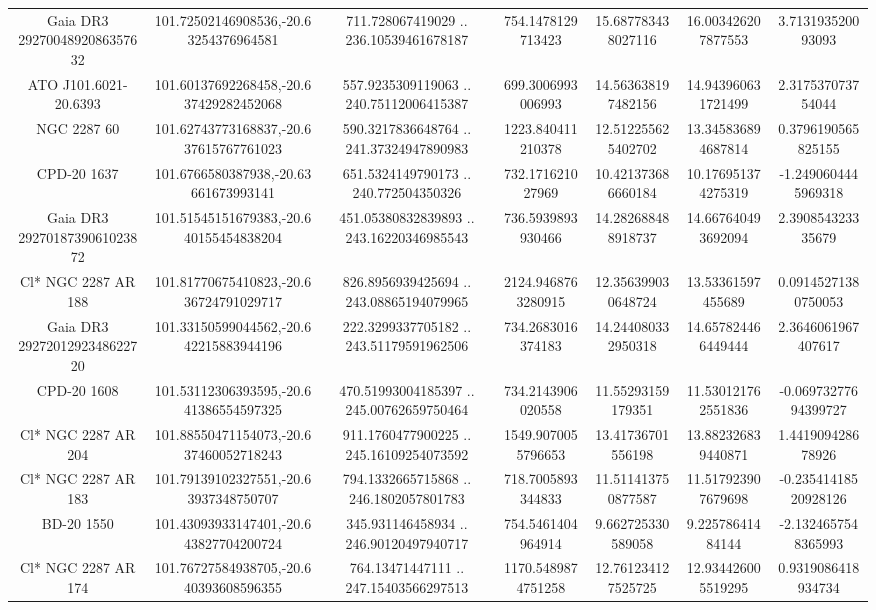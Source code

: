 \begin{table}
\begin{tabular}{ccccccc}
Gaia DR3 2927004892086357632 & 101.72502146908536,-20.63254376964581 & 711.728067419029 .. 236.10539461678187 & 754.1478129713423 & 15.687783438027116 & 16.003426207877553 & 3.713193520093093 \\
ATO J101.6021-20.6393 & 101.60137692268458,-20.637429282452068 & 557.9235309119063 .. 240.75112006415387 & 699.3006993006993 & 14.563638197482156 & 14.943960631721499 & 2.317537073754044 \\
NGC  2287    60 & 101.62743773168837,-20.637615767761023 & 590.3217836648764 .. 241.37324947890983 & 1223.840411210378 & 12.512255625402702 & 13.345836894687814 & 0.3796190565825155 \\
CPD-20  1637 & 101.6766580387938,-20.63661673993141 & 651.5324149790173 .. 240.772504350326 & 732.171621027969 & 10.421373686660184 & 10.176951374275319 & -1.2490604445969318 \\
Gaia DR3 2927018739061023872 & 101.51545151679383,-20.640155454838204 & 451.05380832839893 .. 243.16220346985543 & 736.5939893930466 & 14.282688488918737 & 14.667640493692094 & 2.390854323335679 \\
Cl* NGC 2287     AR     188 & 101.81770675410823,-20.636724791029717 & 826.8956939425694 .. 243.08865194079965 & 2124.9468763280915 & 12.356399030648724 & 13.53361597455689 & 0.09145271380750053 \\
Gaia DR3 2927201292348622720 & 101.33150599044562,-20.642215883944196 & 222.3299337705182 .. 243.51179591962506 & 734.2683016374183 & 14.244080332950318 & 14.657824466449444 & 2.3646061967407617 \\
CPD-20  1608 & 101.53112306393595,-20.641386554597325 & 470.51993004185397 .. 245.00762659750464 & 734.2143906020558 & 11.55293159179351 & 11.530121762551836 & -0.06973277694399727 \\
Cl* NGC 2287     AR     204 & 101.88550471154073,-20.637460052718243 & 911.1760477900225 .. 245.16109254073592 & 1549.9070055796653 & 13.41736701556198 & 13.882326839440871 & 1.441909428678926 \\
Cl* NGC 2287     AR     183 & 101.79139102327551,-20.63937348750707 & 794.1332665715868 .. 246.1802057801783 & 718.7005893344833 & 11.511413750877587 & 11.517923907679698 & -0.23541418520928126 \\
BD-20  1550 & 101.43093933147401,-20.643827704200724 & 345.931146458934 .. 246.90120497940717 & 754.5461404964914 & 9.662725330589058 & 9.22578641484144 & -2.1324657548365993 \\
Cl* NGC 2287     AR     174 & 101.76727584938705,-20.640393608596355 & 764.13471447111 .. 247.15403566297513 & 1170.5489874751258 & 12.761234127525725 & 12.934426005519295 & 0.9319086418934734 \\

\end{tabular}
\end{table}
